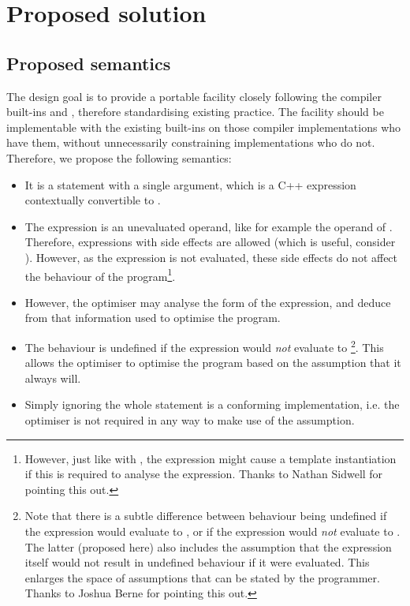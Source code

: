 \section{Proposed solution}

\subsection{Proposed semantics}

The design goal is to provide a portable facility closely following the compiler built-ins  and , therefore standardising existing practice. The facility should be implementable with the existing built-ins on those compiler implementations who have them, without unnecessarily constraining implementations who do not. Therefore, we propose the following semantics:
\begin{itemize}
\item It is a statement with a single argument, which is a C++ expression contextually convertible to .
\item The expression is an unevaluated operand, like for example the operand of . Therefore, expressions with side effects are allowed (which is useful, consider ). However, as the expression is not evaluated, these side effects do not affect the behaviour of the program\footnote{However, just like with , the expression might cause a template instantiation if this is required to analyse the expression. Thanks to Nathan Sidwell for pointing this out.}.
\item However, the optimiser may analyse the form of the expression, and deduce from that information used to optimise the program.
\item The behaviour is undefined if the expression would \emph{not} evaluate to \footnote{Note that there is a subtle difference between behaviour being undefined if the expression would evaluate to , or if the expression would \emph{not} evaluate to . The latter (proposed here) also includes the assumption that the expression itself would not result in undefined behaviour if it were evaluated. This enlarges the space of assumptions that can be stated by the programmer. Thanks to Joshua Berne for pointing this out.}. This allows the optimiser to optimise the program based on the assumption that it always will.
\item Simply ignoring the whole statement is a conforming implementation, i.e. the optimiser is not required in any way to make use of the assumption.
\end{itemize}

